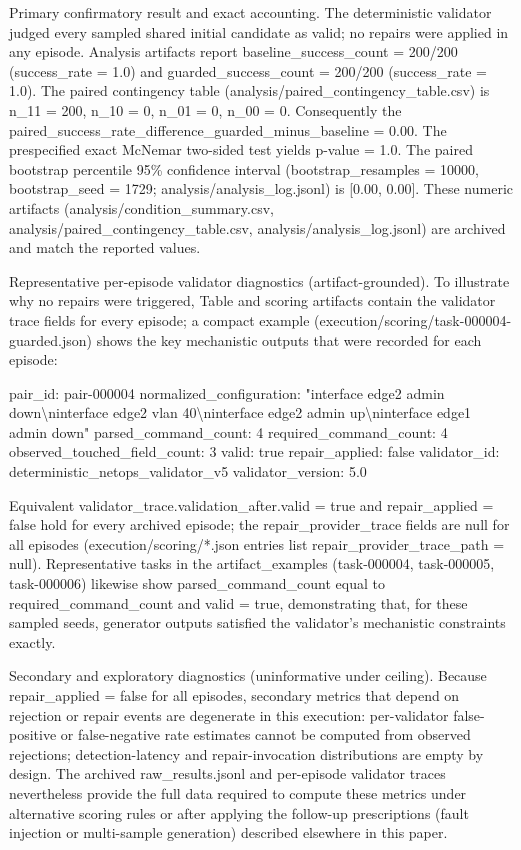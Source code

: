 \documentclass[conference]{IEEEtran}
\begin{document}
Primary confirmatory result and exact accounting. The deterministic validator judged every sampled shared initial candidate as valid; no repairs were applied in any episode. Analysis artifacts report baseline\_success\_count = 200/200 (success\_rate = 1.0) and guarded\_success\_count = 200/200 (success\_rate = 1.0). The paired contingency table (analysis/paired\_contingency\_table.csv) is n\_11 = 200, n\_10 = 0, n\_01 = 0, n\_00 = 0. Consequently the paired\_success\_rate\_difference\_guarded\_minus\_baseline = 0.00. The prespecified exact McNemar two-sided test yields p-value = 1.0. The paired bootstrap percentile 95\% confidence interval (bootstrap\_resamples = 10000, bootstrap\_seed = 1729; analysis/analysis\_log.jsonl) is [0.00, 0.00]. These numeric artifacts (analysis/condition\_summary.csv, analysis/paired\_contingency\_table.csv, analysis/analysis\_log.jsonl) are archived and match the reported values.

Representative per-episode validator diagnostics (artifact-grounded). To illustrate why no repairs were triggered, Table and scoring artifacts contain the validator trace fields for every episode; a compact example (execution/scoring/task-000004-guarded.json) shows the key mechanistic outputs that were recorded for each episode:

pair\_id: pair-000004
  normalized\_configuration: "interface edge2 admin down\textbackslash{}ninterface edge2 vlan 40\textbackslash{}ninterface edge2 admin up\textbackslash{}ninterface edge1 admin down"
  parsed\_command\_count: 4
  required\_command\_count: 4
  observed\_touched\_field\_count: 3
  valid: true
  repair\_applied: false
  validator\_id: deterministic\_netops\_validator\_v5
  validator\_version: 5.0

Equivalent validator\_trace.validation\_after.valid = true and repair\_applied = false hold for every archived episode; the repair\_provider\_trace fields are null for all episodes (execution/scoring/*.json entries list repair\_provider\_trace\_path = null). Representative tasks in the artifact\_examples (task-000004, task-000005, task-000006) likewise show parsed\_command\_count equal to required\_command\_count and valid = true, demonstrating that, for these sampled seeds, generator outputs satisfied the validator's mechanistic constraints exactly.

Secondary and exploratory diagnostics (uninformative under ceiling). Because repair\_applied = false for all episodes, secondary metrics that depend on rejection or repair events are degenerate in this execution: per-validator false-positive or false-negative rate estimates cannot be computed from observed rejections; detection-latency and repair-invocation distributions are empty by design. The archived raw\_results.jsonl and per-episode validator traces nevertheless provide the full data required to compute these metrics under alternative scoring rules or after applying the follow-up prescriptions (fault injection or multi-sample generation) described elsewhere in this paper.
\end{document}
